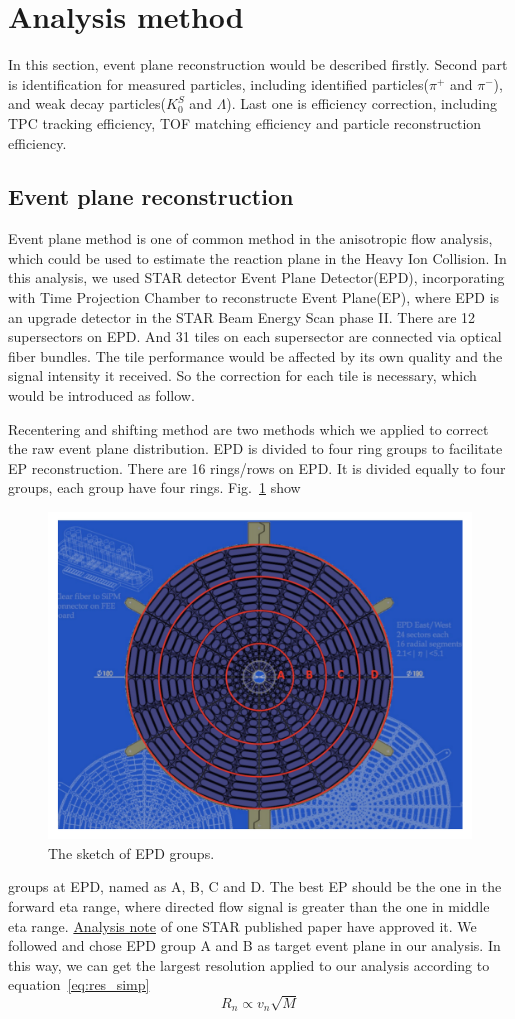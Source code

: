 
\section{Analysis method}
In this section, event plane reconstruction would be described firstly.
Second part is identification for measured particles, including identified particles($\pi^+$ and $\pi^-$), 
and weak decay particles($K_0^S$ and $\Lambda$). Last one is efficiency correction, 
including TPC tracking efficiency, TOF matching efficiency and particle reconstruction efficiency.


\subsection{Event plane reconstruction}
Event plane method is one of common method in the anisotropic flow analysis, which could be used to estimate
the reaction plane in the Heavy Ion Collision.\cite{PhysRevC.83.044913} In this analysis, we used STAR detector 
Event Plane Detector(EPD), incorporating with Time Projection Chamber to reconstructe Event Plane(EP), 
where EPD is an upgrade detector in the STAR Beam Energy Scan phase II.\cite{ADAMS2020163970} There are 12 supersectors
on EPD. And 31 tiles on each supersector are connected via optical fiber bundles.
The tile performance would be affected by its own quality and the signal intensity it received.
So the correction for each tile is necessary, which would be introduced as follow.

Recentering and shifting method are two methods which we applied to correct the raw event plane
distribution. EPD is divided to four ring groups to facilitate EP reconstruction. There are 16 rings/rows
on EPD. It is divided equally to four groups, each group have four rings. Fig.~\ref{fig:EPDgroup} show
\begin{figure}[hbt!]
\centering
\includegraphics[width=0.45\linewidth]{figures/chapter02/EPDgroup.png}
\caption{The sketch of EPD groups.}
\label{fig:EPDgroup}
\end{figure}
groups at EPD, named as A, B, C and D. The best EP should be the one in the forward eta range, where directed flow
signal is greater than the one in middle eta range. \href{https://drupal.star.bnl.gov/STAR/system/files/FXT3gev_note_v4.pdf}{Analysis note} of one STAR published paper have approved it. 
We followed and chose EPD group A and B as target event plane in our analysis.
In this way, we can get the largest resolution applied to our analysis according to equation~\ref{eq:res_simp}
\begin{equation}
    R_n \propto v_n \sqrt{M}
\label{eq:res_simp}
\end{equation}


